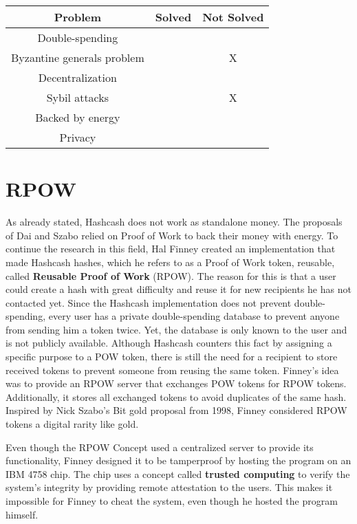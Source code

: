 \begin{center}
	\begin{tabular}{|c c c|} 
    \hline
	Problem & Solved & Not Solved \\ [0.5ex] 
	\hline
	Double-spending & \checkmark &  \\ [0.5ex] 
	\hline
	Byzantine generals problem &  & X \\ [0.5ex] 
	\hline
	Decentralization & \checkmark  & \\ [0.5ex] 
	\hline
	Sybil attacks &  & X \\ [0.5ex] 
	\hline
	Backed by energy & \checkmark & \\ [0.5ex] 
	\hline
	Privacy & \checkmark &  \\ [0.5ex]  
	\hline
	\end{tabular}
\end{center}

\section{RPOW}
As already stated, Hashcash does not work as standalone money.
The proposals of Dai and Szabo relied on Proof of Work to back their money with energy.
To continue the research in this field, Hal Finney created an implementation that made Hashcash hashes, which he refers to as a Proof of Work token, reusable, called \textbf{Reusable Proof of Work} (RPOW).
The reason for this is that a user could create a hash with great difficulty and reuse it for new recipients he has not contacted yet.
Since the Hashcash implementation does not prevent double-spending, every user has a private double-spending database to prevent anyone from sending him a token twice.
Yet, the database is only known to the user and is not publicly available.
Although Hashcash counters this fact by assigning a specific purpose to a POW token, there is still the need for a recipient to store received tokens to prevent someone from reusing the same token.
Finney's idea was to provide an RPOW server that exchanges POW tokens for RPOW tokens.
Additionally, it stores all exchanged tokens to avoid duplicates of the same hash.
Inspired by Nick Szabo's Bit gold proposal from 1998, Finney considered RPOW tokens a digital rarity like gold.

Even though the RPOW Concept used a centralized server to provide its functionality, Finney designed it to be tamperproof by hosting the program on an IBM 4758 chip.
The chip uses a concept called \textbf{trusted computing} \cite{trusted_computing} to verify the system's integrity by providing remote attestation to the users.
This makes it impossible for Finney to cheat the system, even though he hosted the program himself.

